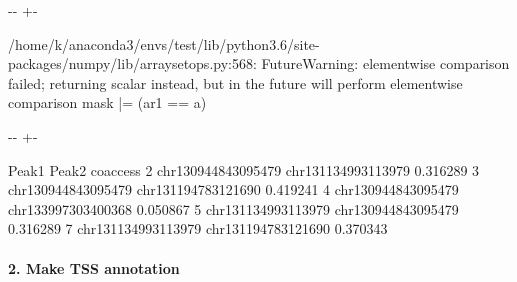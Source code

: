 \documentclass[letterpaper,10pt,english]{sphinxmanual}
\newlength\nbsphinxcodecellspacing
\begin{document}
%
{
\kern-\sphinxverbatimsmallskipamount\kern-\baselineskip
\kern+\FrameHeightAdjust\kern-\fboxrule
\vspace{\nbsphinxcodecellspacing}
%
\begin{sphinxVerbatim}[commandchars=\\\{\}]
/home/k/anaconda3/envs/test/lib/python3.6/site-packages/numpy/lib/arraysetops.py:568: FutureWarning: elementwise comparison failed; returning scalar instead, but in the future will perform elementwise comparison
  mask |= (ar1 == a)
\end{sphinxVerbatim}
}
\relax

{

\kern-\sphinxverbatimsmallskipamount\kern-\baselineskip
\kern+\FrameHeightAdjust\kern-\fboxrule
\vspace{\nbsphinxcodecellspacing}

%
\begin{sphinxVerbatim}[commandchars=\\\{\}]
\llap{\color{nbsphinxout}[4]:\,\hspace{\fboxrule}\hspace{\fboxsep}}                  Peak1                 Peak2  coaccess
2  chr1\PYGZus{}3094484\PYGZus{}3095479  chr1\PYGZus{}3113499\PYGZus{}3113979 \PYGZhy{}0.316289
3  chr1\PYGZus{}3094484\PYGZus{}3095479  chr1\PYGZus{}3119478\PYGZus{}3121690 \PYGZhy{}0.419241
4  chr1\PYGZus{}3094484\PYGZus{}3095479  chr1\PYGZus{}3399730\PYGZus{}3400368 \PYGZhy{}0.050867
5  chr1\PYGZus{}3113499\PYGZus{}3113979  chr1\PYGZus{}3094484\PYGZus{}3095479 \PYGZhy{}0.316289
7  chr1\PYGZus{}3113499\PYGZus{}3113979  chr1\PYGZus{}3119478\PYGZus{}3121690  0.370343
\end{sphinxVerbatim}
}


\paragraph{2. Make TSS annotation}
\label{\detokenize{notebooks/01_ATAC-seq_data_processing/option1_scATAC-seq_data_analysis_with_cicero/02_preprocess_peak_data:2.-Make-TSS-annotation}}
\end{document}

